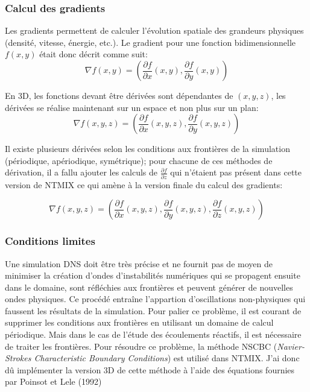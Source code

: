 
\subsubsection{Calcul des gradients}%

Les gradients permettent de calculer l'évolution spatiale des grandeurs physiques (densité, vitesse, énergie, etc.). Le gradient pour une fonction bidimensionnelle $f(x,y)$ était donc décrit comme suit:
$$\nabla f(x,y) =\left(\frac{\partial f}{\partial x}(x,y),\frac{\partial f}{\partial y}(x,y)\right) $$

En 3D, les fonctions devant être dérivées sont dépendantes de $(x,y,z)$, les dérivées se réalise maintenant sur un espace et non plus sur un plan:
$$ \nabla f(x,y,z) =\left(\frac{\partial f}{\partial x}(x,y,z),\frac{\partial f}{\partial y}(x,y,z)\right)$$


Il existe plusieurs dérivées selon les conditions aux frontières de la simulation (périodique, apériodique, symétrique); pour chacune de ces méthodes de dérivation, il a fallu ajouter les calculs de $\frac{\partial f}{\partial z}$ qui n'étaient pas présent dans cette version de NTMIX ce qui amène à la version finale du calcul des gradients:

$$ \nabla f(x,y,z) =\left(\frac{\partial f}{\partial x}(x,y,z),\frac{\partial f}{\partial y}(x,y,z),\frac{\partial f}{\partial z}(x,y,z)\right)$$



\subsubsection{Conditions limites}\label{sec:nsbc}
Une simulation DNS doit être très précise et ne fournit pas de moyen de minimiser la création d'ondes d'instabilités numériques qui se propagent ensuite dans le domaine, sont réfléchies aux frontières et peuvent générer de nouvelles ondes physiques\cite{baritaud1996direct}. Ce procédé entraîne l'appartion d'oscillations non-physiques qui faussent les résultats de la simulation. Pour palier ce problème, il est courant de supprimer les conditions aux frontières en utilisant un domaine de calcul périodique. Mais dans le cas de l'étude des écoulements réactifs, il est nécessaire de traiter les frontières. Pour résoudre ce problème, la méthode NSCBC (\textit{Navier-Strokes Characteristic Boundary Conditions}) est utilisé dans NTMIX. J'ai donc dû implémenter la version 3D de cette méthode à l'aide des équations fournies par Poinsot et Lele (1992)\cite{POINSOT1992104}


